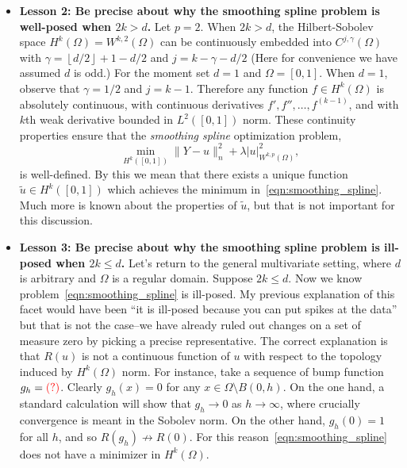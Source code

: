 \documentclass{article}
\newcommand{\floor}[1]{\left\lfloor #1 \right\rfloor}
\newcommand{\1}{\mathbf{1}}
\newcommand{\wt}[1]{\widetilde{#1}}
\theoremstyle{alden}
\theoremstyle{aldenthm}
\theoremstyle{definition}
\theoremstyle{remark}
\begin{document}
\begin{itemize}
	\item \textbf{Lesson 2: Be precise about why the smoothing spline problem is well-posed when $2k > d$.} Let $p = 2$. When $2k > d$, the Hilbert-Sobolev space $H^k(\Omega) = W^{k,2}(\Omega)$ can be continuously embedded into $C^{j,\gamma}(\Omega)$ with $\gamma = \floor{d/2} + 1 - d/2$ and $j = k - \gamma - d/2$ (Here for convenience we have assumed $d$ is odd.) For the moment set $d = 1$ and $\Omega = [0,1]$. When $d = 1$, observe that $\gamma = 1/2$ and $j = k - 1$. Therefore any function $f \in H^k(\Omega)$ is absolutely continuous, with continuous derivatives $f',f'',\ldots,f^{(k- 1)}$, and with $k$th weak derivative bounded in $L^2([0,1])$ norm. These continuity properties ensure that the \emph{smoothing spline} optimization problem,
	\begin{equation}
	\label{eqn:smoothing_spline}
	\min_{H^k([0,1])} \|Y - u\|_n^2 + \lambda |u|_{W^{k,p}(\Omega)}^2,
	\end{equation}
	is well-defined. By this we mean that there exists a unique function $\wt{u} \in H^k([0,1])$ which achieves the minimum in~\eqref{eqn:smoothing_spline}. Much more is known about the properties of $\wt{u}$, but that is not important for this discussion.
	\item \textbf{Lesson 3: Be precise about why the smoothing spline problem is ill-posed when $2k \leq d$.} Let's return to the general multivariate setting, where $d$ is arbitrary and $\Omega$ is a regular domain. Suppose $2k \leq d$. Now we know problem~\eqref{eqn:smoothing_spline} is ill-posed. My previous explanation of this facet would have been ``it is ill-posed because you can put spikes at the data'' but that is not the case--we have already ruled out changes on a set of measure zero by picking a precise representative. The correct explanation is that $R(u)$ is not a continuous function of $u$ with respect to the topology induced by $H^k(\Omega)$ norm. For instance, take a sequence of bump function $g_h = \textcolor{red}{(?)}$. Clearly $g_h(x) = 0$ for any $x \in \Omega\setminus B(0,h)$. On the one hand, a standard calculation will show that $g_h \to 0$ as $h \to \infty$, where crucially convergence is meant in the Sobolev norm. On the other hand, $g_h(0) = 1$ for all $h$, and so $R(g_h) \not\to R(0)$. For this reason~\eqref{eqn:smoothing_spline} does not have a minimizer in $H^k(\Omega)$. 
	

\end{itemize}
\end{document}
